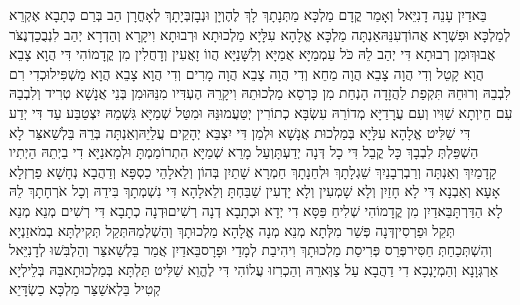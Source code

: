 \documentclass[../main/main.tex]{subfiles}
\begin{document}
\begin{multicols*}{\ncols}
בֵּאדַיִן עָנֵה דָנִיֵּאל וְאָמַר קֳדָם מַלְכָּא מַתְּנָתָךְ לָךְ לֶהֶוְיָן וּנְבָזְבְּיָתָךְ לְאָחֳרָן הַב בְּרַם כְּתָבָא אֶקְרֵא לְמַלְכָּא וּפִשְׁרָא אֲהוֹדְעִנֵּהּ\PreVerseSpace{}אַנְתָּה מַלְכָּא אֱלָהָא עִלָּיָא מַלְכוּתָא וּרְבוּתָא וִיקָרָא וְהַדְרָא יְהַב לִנְבֻכַדְנֶצֹּר אֲבוּךְ\PreVerseSpace{}וּמִן רְבוּתָא דִּי יְהַב לֵהּ כֹּל עַמְמַיָּא אֻמַיָּא וְלִשָּׁנַיָּא הֲווֹ זָאֲעִין וְדָחֲלִין מִן קֳדָמוֹהִי דִּי הֲוָא צָבֵא הֲוָא קָטֵל וְדִי הֲוָה צָבֵא הֲוָה מַחֵא וְדִי הֲוָה צָבֵא הֲוָה מָרִים וְדִי הֲוָא צָבֵא הֲוָא מַשְׁפִּיל\PreVerseSpace{}וּכְדִי רִם לִבְבֵהּ וְרוּחֵהּ תִּקְפַת לַהֲזָדָה הָנְחַת מִן כָּרְסֵא מַלְכוּתֵהּ וִיקָרֵהּ\SubEnd{} הֶעְדִּיו מִנֵּהּ\PreVerseSpace{}וּמִן בְּנֵי אֲנָשָׁא טְרִיד וְלִבְבֵהּ עִם חֵיוְתָא שַׁוִּיו\SubEnd{} וְעִם עֲרָדַיָּא מְדוֹרֵהּ עִשְׂבָּא כְתוֹרִין יְטַעֲמוּנֵּהּ וּמִטַּל שְׁמַיָּא גִּשְׁמֵהּ יִצְטַבַּע עַד דִּי יְדַע דִּי שַׁלִּיט אֱלָהָא עִלָּיָא בְּמַלְכוּת אֲנָשָׁא וּלְמַן דִּי יִצְבֵּא יְהָקֵים עֲלַיֵהּ\PreVerseSpace{}וְאַנְתָּה בְּרֵהּ בֵּלְשַׁאצַּר לָא הַשְׁפֵּלְתְּ לִבְבָךְ כָּל קֳבֵל דִּי כָל דְּנָה יְדַעְתָּ\PreVerseSpace{}וְעַל מָרֵא שְׁמַיָּא הִתְרוֹמַמְתָּ וּלְמָאנַיָּא דִי בַיְתֵהּ הַיְתִיו קָדָמַיִךְ וְאַנְתָּה וְרַבְרְבָנַיִךְ שֵׁגְלָתָךְ וּלְחֵנָתָךְ חַמְרָא שָׁתַיִן בְּהוֹן וְלֵאלָהֵי כַסְפָּא וְדַהֲבָא נְחָשָׁא פַרְזְלָא אָעָא וְאַבְנָא דִּי לָא חָזַיִן וְלָא שָׁמְעִין וְלָא יָדְעִין שַׁבַּחְתָּ וְלֵאלָהָא דִּי נִשְׁמְתָךְ בִּידֵהּ וְכָל אֹרְחָתָךְ לֵהּ לָא הַדַּרְתָּ\PreVerseSpace{}בֵּאדַיִן מִן קֳדָמוֹהִי שְׁלִיחַ פַּסָּא דִי יְדָא וּכְתָבָא דְנָה רְשִׁים\PreVerseSpace{}וּדְנָה כְתָבָא דִּי רְשִׁים מְנֵא מְנֵא תְּקֵל וּפַרְסִין\PreVerseSpace{}דְּנָה פְּשַׁר מִלְּתָא מְנֵא מְנָה אֱלָהָא מַלְכוּתָךְ וְהַשְׁלְמַהּ\PreVerseSpace{}תְּקֵל תְּקִילְתָּא בְמֹאזַנְיָא וְהִשְׁתְּכַחַתְּ חַסִּיר\PreVerseSpace{}פְּרֵס פְּרִיסַת מַלְכוּתָךְ וִיהִיבַת לְמָדַי וּפָרָס\PreVerseSpace{}בֵּאדַיִן אֲמַר בֵּלְשַׁאצַּר וְהַלְבִּשׁוּ לְדָנִיֵּאל אַרְגְּוָנָא וְהַמְיָנְכָא\SubEnd{} דִי דַהֲבָא עַל צַוְּארֵהּ וְהַכְרִזוּ עֲלוֹהִי דִּי לֶהֱוֵא שַׁלִּיט תַּלְתָּא בְּמַלְכוּתָא\PreVerseSpace{}בֵּהּ בְּלֵילְיָא קְטִיל בֵּלְאשַׁצַּר מַלְכָּא כַשְׂדָּיֵא\OpenSection{}\par

\end{multicols*}
\end{document}

